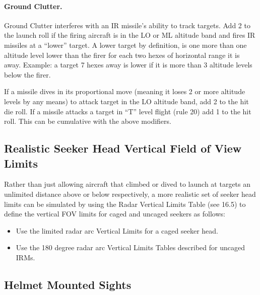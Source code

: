 \paragraph{Ground Clutter.} Ground Clutter interferes with an IR missile's ability to track targets. Add 2 to the launch roll if the firing aircraft is in the LO or ML altitude band and fires IR missiles at a “lower” target. A lower target by definition, is one more than one altitude level lower than the firer for each two hexes of horizontal range it is away. Example: a target 7 hexes away is lower if it is more than 3 altitude levels below the firer.

If a missile dives in its proportional move (meaning it loses 2 or more altitude levels by any means) to attack target in the LO altitude band, add 2 to the hit die roll. If a missile attacks a target in “T” level flight (rule 20) add 1 to the hit roll. This can be cumulative with the above modifiers.


\advancedrules

\subsection{Realistic Seeker Head Vertical Field of View Limits}

Rather than just allowing aircraft that climbed or dived to launch at targets an unlimited distance above or below respectively, a more realistic set of seeker head limits can be simulated by using the Radar Vertical Limits Table (see 16.5) to define the vertical FOV limits for caged and uncaged seekers as follows:

\begin{itemize}

    \item Use the limited radar arc Vertical Limits for a caged seeker head.

    \item Use the 180 degree radar arc Vertical Limits Tables described for uncaged IRMs.

\end{itemize}

\subsection{Helmet Mounted Sights}

